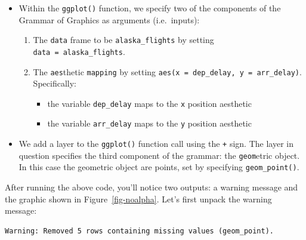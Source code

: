 \documentclass[
  letterpaper,
  DIV=11,
  numbers=noendperiod]{scrreprt}
\providecommand{\tightlist}{%
  \setlength{\itemsep}{0pt}\setlength{\parskip}{0pt}}\usepackage{longtable,booktabs,array}
\theoremstyle{definition}
\theoremstyle{remark}
\begin{document}
\begin{itemize}
\tightlist
\item
  Within the \texttt{ggplot()} function, we specify two of the
  components of the Grammar of Graphics as arguments (i.e.~inputs):

  \begin{enumerate}
  \def\labelenumi{\arabic{enumi}.}
  \tightlist
  \item
    The \texttt{data} frame to be \texttt{alaska\_flights} by setting
    \texttt{data\ =\ alaska\_flights}.
  \item
    The \texttt{aes}thetic \texttt{mapping} by setting
    \texttt{aes(x\ =\ dep\_delay,\ y\ =\ arr\_delay)}. Specifically:

    \begin{itemize}
    \tightlist
    \item
      the variable \texttt{dep\_delay} maps to the \texttt{x} position
      aesthetic
    \item
      the variable \texttt{arr\_delay} maps to the \texttt{y} position
      aesthetic
    \end{itemize}
  \end{enumerate}
\item
  We add a layer to the \texttt{ggplot()} function call using the
  \texttt{+} sign. The layer in question specifies the third component
  of the grammar: the \texttt{geom}etric object. In this case the
  geometric object are points, set by specifying \texttt{geom\_point()}.
\end{itemize}

After running the above code, you'll notice two outputs: a warning
message and the graphic shown in Figure~\ref{fig-noalpha}. Let's first
unpack the warning message:

\begin{verbatim}
Warning: Removed 5 rows containing missing values (geom_point).
\end{verbatim}
\end{document}
